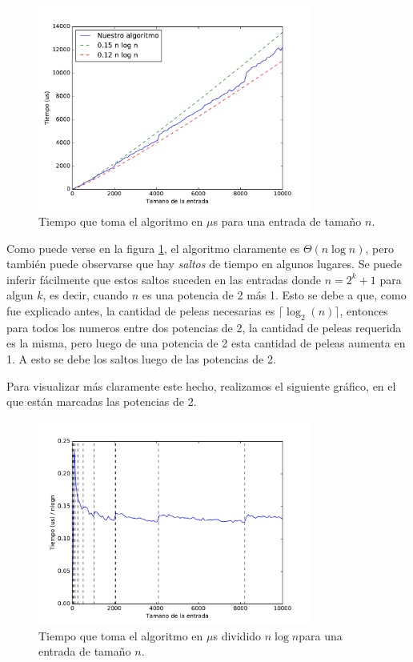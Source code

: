 \begin{figure}[H]
 \centering
	\includegraphics[width=0.8\textwidth]{img/tiempos/kaioken1.pdf}
	\caption{\footnotesize Tiempo que toma el algoritmo en $\mu$s para una entrada de tamaño $n$.}
	\label{fig:kaioken-tiempos1}
\end{figure}

Como puede verse en la figura \ref{fig:kaioken-tiempos1}, el algoritmo claramente es $\Theta(n \log n)$, pero también puede observarse que hay \emph{saltos} de tiempo en algunos lugares. Se puede inferir fácilmente que estos saltos suceden en las entradas donde $n = 2^k + 1$ para algun $k$, es decir, cuando $n$ es una potencia de 2 más 1. Esto se debe a que, como fue explicado antes, la cantidad de peleas necesarias es $\lceil \log_2(n) \rceil$, entonces para todos los numeros entre dos potencias de 2, la cantidad de peleas requerida es la misma, pero luego de una potencia de 2 esta cantidad de peleas aumenta en 1. A esto se debe los saltos luego de las potencias de 2.

Para visualizar más claramente este hecho, realizamos el siguiente gráfico, en el que están marcadas las potencias de 2.

\begin{figure}[H]
 \centering
	\includegraphics[width=0.8\textwidth]{img/tiempos/kaioken2.pdf}
	\caption{\footnotesize Tiempo que toma el algoritmo en $\mu$s dividido $n\log n$para una entrada de tamaño $n$.}
	\label{fig:kaioken-tiempos2}
\end{figure}

